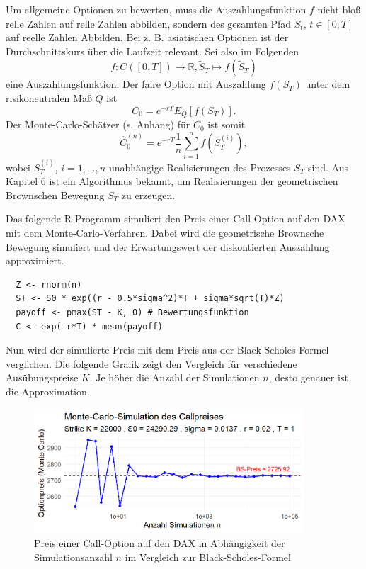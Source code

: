 \begin{lemma}
Um allgemeine Optionen zu bewerten, muss die Auszahlungsfunktion $f$
nicht bloß relle Zahlen auf relle Zahlen abbilden, sondern des gesamten Pfad
$S_t$, $t\in[0,T]$ auf reelle Zahlen Abbilden. Bei z. B. asiatischen Optionen ist
der Durchschnittskurs über die Laufzeit relevant.
Sei also im Folgenden 
$$f: C([0,T]) \to \mathbb R, \tilde S_T \mapsto f(\tilde S_T)$$
eine Auszahlungsfunktion. Der faire Option mit Auszahlung $f(S_T)$
unter dem risikoneutralen Maß $Q$ ist
$$
C_0 = e^{-rT} E_Q[f(S_T)].
$$
Der Monte-Carlo-Schätzer (s. Anhang) für $C_0$ ist somit
$$
\hat{C}_0^{(n)} = e^{-rT} \frac{1}{n} \sum_{i=1}^n f(S_T^{(i)}),
$$
wobei $S_T^{(i)}$, $i=1,\ldots,n$ unabhängige Realisierungen des Prozesses $S_T$ sind. Aus Kapitel 6 ist
ein Algorithmus bekannt, um Realisierungen der geometrischen Brownschen Bewegung $S_T$ zu erzeugen.

\end{lemma}

\begin{bsp}

Das folgende R-Programm simuliert den Preis einer Call-Option auf den DAX
mit dem Monte-Carlo-Verfahren. Dabei wird die geometrische Brownsche Bewegung
simuliert und der Erwartungswert der diskontierten Auszahlung approximiert.

\begin{lstlisting}
  Z <- rnorm(n)
  ST <- S0 * exp((r - 0.5*sigma^2)*T + sigma*sqrt(T)*Z)
  payoff <- pmax(ST - K, 0) # Bewertungsfunktion
  C <- exp(-r*T) * mean(payoff)
\end{lstlisting}
Nun wird der simulierte Preis mit dem Preis aus der Black-Scholes-Formel verglichen. 
Die folgende Grafik zeigt den Vergleich für verschiedene Ausübungspreise $K$.
Je höher die Anzahl der Simulationen $n$, desto genauer ist die Approximation.

\begin{figure}[H]
    \centering
    \includegraphics[width=0.9\textwidth]{images/call_dax_mc.png}
    \caption{Preis einer Call-Option auf den DAX in Abhängigkeit der Simulationsanzahl $n$ im Vergleich zur Black-Scholes-Formel}
    \label{fig:call_dax_mc}
\end{figure}

\end{bsp}

